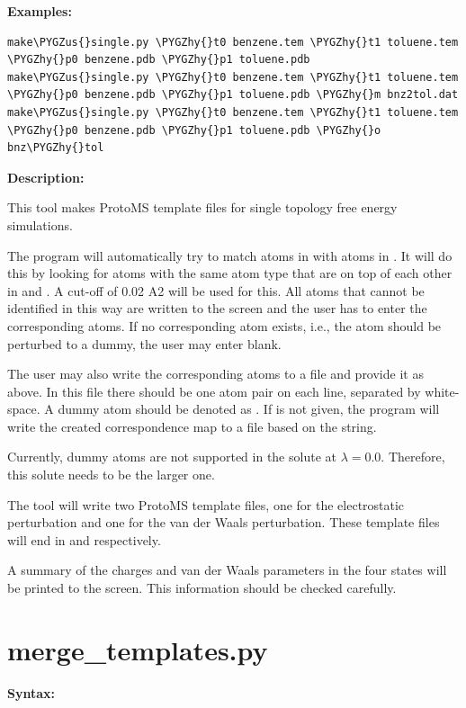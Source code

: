 \documentclass[letterpaper,10pt,english]{sphinxmanual}
\def\PYGZus{\char`\_}
\def\PYGZhy{\char`\-}
\begin{document}
\textbf{Examples:}

\begin{Verbatim}[commandchars=\\\{\}]
make\PYGZus{}single.py \PYGZhy{}t0 benzene.tem \PYGZhy{}t1 toluene.tem \PYGZhy{}p0 benzene.pdb \PYGZhy{}p1 toluene.pdb
make\PYGZus{}single.py \PYGZhy{}t0 benzene.tem \PYGZhy{}t1 toluene.tem \PYGZhy{}p0 benzene.pdb \PYGZhy{}p1 toluene.pdb \PYGZhy{}m bnz2tol.dat
make\PYGZus{}single.py \PYGZhy{}t0 benzene.tem \PYGZhy{}t1 toluene.tem \PYGZhy{}p0 benzene.pdb \PYGZhy{}p1 toluene.pdb \PYGZhy{}o bnz\PYGZhy{}tol
\end{Verbatim}

\textbf{Description:}

This tool makes ProtoMS template files for single topology free energy simulations.

The program will automatically try to match atoms in  with atoms in . It will do this by looking for atoms with the same atom type that are on top of each other in  and . A cut-off of 0.02 A2 will be used for this. All atoms that cannot be identified in this way are written to the screen and the user has to enter the corresponding atoms. If no corresponding atom exists, i.e., the atom should be perturbed to a dummy, the user may enter blank.

The user may also write the corresponding atoms to a file and provide it as  above. In this file there should be one atom pair on each line, separated by white-space. A dummy atom should be denoted as . If  is not given, the program will write the created correspondence map to a file based on the  string.

Currently, dummy atoms are not supported in the solute at \(\lambda=0.0\). Therefore, this solute needs to be the larger one.

The tool will write two ProtoMS template files, one for the electrostatic perturbation and one for the van der Waals perturbation. These template files will end in  and  respectively.

A summary of the charges and van der Waals parameters in the four states will be printed to the screen. This information should be checked carefully.


\section{merge\_templates.py}
\label{tools:merge-templates-py}
\textbf{Syntax:}
\end{document}
